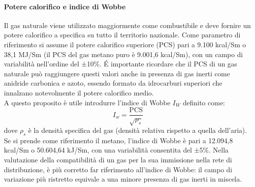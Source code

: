 \paragraph{Potere calorifico e indice di Wobbe}
Il gas naturale viene utilizzato maggiormente come combustibile e deve fornire un potere calorifico a specifica su tutto il territorio nazionale. Come parametro di riferimento si assume il potere calorifico superiore (PCS) pari a 9.100 kcal/Sm o 38,1 MJ/Sm (il PCS del gas metano puro è 9.001,6 kcal/Sm), con un campo di variabilità nell'ordine del ±10\%. \'E importante ricordare che il PCS di un gas naturale può raggiungere questi valori anche in presenza di gas inerti come anidride carbonica e azoto, essendo formato da idrocarburi superiori che innalzano notevolmente il potere calorifico medio.\\
A questo proposito è utile introdurre l'indice di Wobbe \(I_W\) definito come:
\[I_w = \dfrac{\textrm{PCS}}{\sqrt{\rho_s}} \label{eq:wobbe} \]
dove \(\rho_s\) è la densità specifica del gas (densità relativa rispetto a quella dell'aria). Se si prende come riferimento il metano, l'indice di Wobbe è pari a 12.094,8 kcal/Sm o 50.604,64 kJ/Sm, con una variabilità consentita del ±5\%. Nella valutazione della compatibilità di un gas per la sua immissione nella rete di distribuzione, è più corretto far riferimento all'indice di Wobbe: il campo di variazione più ristretto equivale a una minore presenza di gas inerti in miscela.

